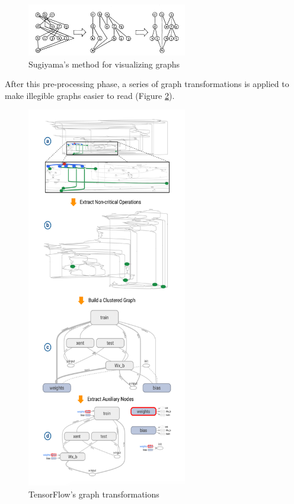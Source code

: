 \documentclass{acmsiggraph}               %
\begin{document}
\begin{figure}[H]
\includegraphics[width=2.75in]{sugiyama_method_sugiyama_et_al}
\caption{Sugiyama's method for visualizing graphs \protect\cite{Sugiyama1981}}
\label{fig:sugiyama_method}
\centering
\end{figure}

After this pre-processing phase, a series of graph transformations is applied to make illegible graphs easier to read (Figure \ref{fig:transformations}). \\

\begin{figure}[!htb]
\includegraphics[width=2.75in]{transformations_Wongsuphasawat_et_al}
\caption{TensorFlow's graph transformations \protect\cite{Wongsuphasawat2018}}
\label{fig:transformations}
\end{figure}
\end{document}
